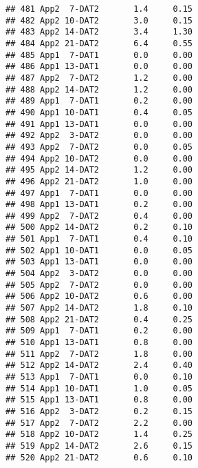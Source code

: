 \documentclass[
]{article}
\begin{document}
\begin{verbatim}
## 481 App2  7-DAT2       1.4     0.15
## 482 App2 10-DAT2       3.0     0.15
## 483 App2 14-DAT2       3.4     1.30
## 484 App2 21-DAT2       6.4     0.55
## 485 App1  7-DAT1       0.0     0.00
## 486 App1 13-DAT1       0.0     0.00
## 487 App2  7-DAT2       1.2     0.00
## 488 App2 14-DAT2       1.2     0.00
## 489 App1  7-DAT1       0.2     0.00
## 490 App1 10-DAT1       0.4     0.05
## 491 App1 13-DAT1       0.0     0.00
## 492 App2  3-DAT2       0.0     0.00
## 493 App2  7-DAT2       0.0     0.05
## 494 App2 10-DAT2       0.0     0.00
## 495 App2 14-DAT2       1.2     0.00
## 496 App2 21-DAT2       1.0     0.00
## 497 App1  7-DAT1       0.0     0.00
## 498 App1 13-DAT1       0.2     0.00
## 499 App2  7-DAT2       0.4     0.00
## 500 App2 14-DAT2       0.2     0.10
## 501 App1  7-DAT1       0.4     0.10
## 502 App1 10-DAT1       0.0     0.05
## 503 App1 13-DAT1       0.0     0.00
## 504 App2  3-DAT2       0.0     0.00
## 505 App2  7-DAT2       0.0     0.00
## 506 App2 10-DAT2       0.6     0.00
## 507 App2 14-DAT2       1.8     0.10
## 508 App2 21-DAT2       0.4     0.25
## 509 App1  7-DAT1       0.2     0.00
## 510 App1 13-DAT1       0.8     0.00
## 511 App2  7-DAT2       1.8     0.00
## 512 App2 14-DAT2       2.4     0.40
## 513 App1  7-DAT1       0.0     0.10
## 514 App1 10-DAT1       1.0     0.05
## 515 App1 13-DAT1       0.8     0.00
## 516 App2  3-DAT2       0.2     0.15
## 517 App2  7-DAT2       2.2     0.00
## 518 App2 10-DAT2       1.4     0.25
## 519 App2 14-DAT2       2.6     0.15
## 520 App2 21-DAT2       0.6     0.10
\end{verbatim}
\end{document}
